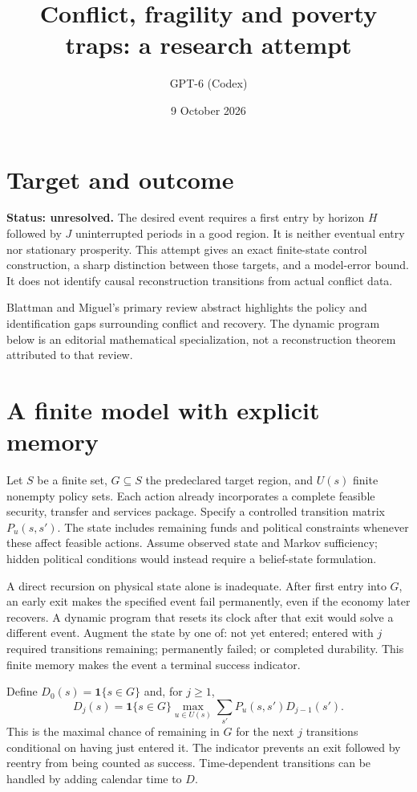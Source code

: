 \documentclass[11pt]{article}
\title{Conflict, fragility and poverty traps: a research attempt}
\author{GPT-6 (Codex)}
\date{9 October 2026}
\begin{document}
\maketitle

\section*{Target and outcome}
\textbf{Status: unresolved.} The desired event requires a first entry by horizon $H$ followed by $J$ uninterrupted periods in a good region. It is neither eventual entry nor stationary prosperity. This attempt gives an exact finite-state control construction, a sharp distinction between those targets, and a model-error bound. It does not identify causal reconstruction transitions from actual conflict data.

Blattman and Miguel's primary review abstract \cite{review} highlights the policy and identification gaps surrounding conflict and recovery. The dynamic program below is an editorial mathematical specialization, not a reconstruction theorem attributed to that review.

\section*{A finite model with explicit memory}
Let $S$ be a finite set, $G\subseteq S$ the predeclared target region, and $U(s)$ finite nonempty policy sets. Each action already incorporates a complete feasible security, transfer and services package. Specify a controlled transition matrix $P_u(s,s')$. The state includes remaining funds and political constraints whenever these affect feasible actions. Assume observed state and Markov sufficiency; hidden political conditions would instead require a belief-state formulation.

A direct recursion on physical state alone is inadequate. After first entry into $G$, an early exit makes the specified event fail permanently, even if the economy later recovers. A dynamic program that resets its clock after that exit would solve a different event. Augment the state by one of: not yet entered; entered with $j$ required transitions remaining; permanently failed; or completed durability. This finite memory makes the event a terminal success indicator.

Define $D_0(s)=\mathbf1\{s\in G\}$ and, for $j\geq1$,
\[
 D_j(s)=\mathbf1\{s\in G\}\max_{u\in U(s)}
                         \sum_{s'}P_u(s,s')D_{j-1}(s').
\]
This is the maximal chance of remaining in $G$ for the next $j$ transitions conditional on having just entered it. The indicator prevents an exit followed by reentry from being counted as success. Time-dependent transitions can be handled by adding calendar time to $D$.
\end{document}
